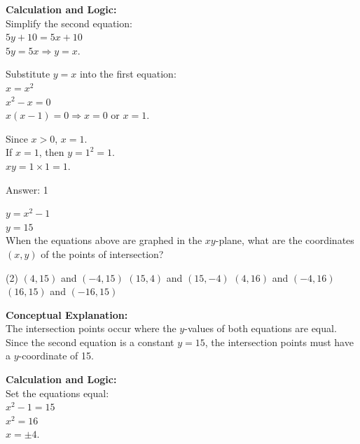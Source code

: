 \documentclass[11pt,paper=a4,answers]{exam}
\begin{document}
\begin{questions}
\begin{solution}
\vspace{20pt}

\textbf{Calculation and Logic:} \\
Simplify the second equation: \\
$5y + 10 = 5x + 10$ \\
$5y = 5x \Rightarrow y = x$.

\vspace{10pt}

Substitute $y = x$ into the first equation: \\
$x = x^2$ \\
$x^2 - x = 0$ \\
$x(x - 1) = 0 \Rightarrow x = 0$ or $x = 1$.

\vspace{10pt}

Since $x > 0$, $x = 1$. \\
If $x = 1$, then $y = 1^2 = 1$. \\
$xy = 1 \times 1 = 1$.

\vspace{25pt}

Answer: \colorbox{yellow!100}{1}
\end{solution}

\vspace{40pt}

\question
$y = x^2 - 1$ \\
$y = 15$ \\
When the equations above are graphed in the $xy$-plane, what are the coordinates $(x, y)$ of the points of intersection?
\begin{tasks}(2)
    \task $(4, 15)$ and $(-4, 15)$
    \task $(15, 4)$ and $(15, -4)$
    \task $(4, 16)$ and $(-4, 16)$
    \task $(16, 15)$ and $(-16, 15)$
\end{tasks}

\begin{solution}
\textbf{Conceptual Explanation:} \\
The intersection points occur where the $y$-values of both equations are equal. Since the second equation is a constant $y = 15$, the intersection points must have a $y$-coordinate of 15.

\vspace{20pt}

\textbf{Calculation and Logic:} \\
Set the equations equal: \\
$x^2 - 1 = 15$ \\
$x^2 = 16$ \\
$x = \pm 4$.


\end{solution}
\end{questions}
\end{document}
